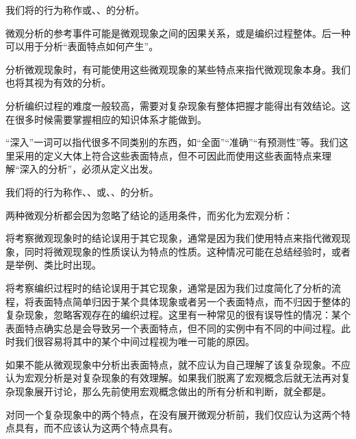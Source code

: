 我们将的行为称作或、、的分析。
\begin{explain}
微观分析的参考事件可能是微观现象之间的因果关系，或是编织过程整体。后一种可以用于分析“表面特点如何产生”。

分析微观现象时，有可能使用这些微观现象的某些特点来指代微观现象本身。我们也将其视为有效的分析。

分析编织过程的难度一般较高，需要对复杂现象有整体把握才能得出有效结论。这在很多时候需要掌握相应的知识体系才能做到。

“深入”一词可以指代很多不同类别的东西，如“全面”“准确”“有预测性”等。我们这里采用的定义大体上符合这些表面特点，但不可因此而使用这些表面特点来理解“深入的分析”，必须从定义出发。
\end{explain}
我们将的行为称作、、或、、的分析。
\begin{explain}
两种微观分析都会因为忽略了结论的适用条件，而劣化为宏观分析：

将考察微观现象时的结论误用于其它现象，通常是因为我们使用特点来指代微观现象，同时将微观现象的性质误认为特点的性质。这种情况可能在总结经验时，或者是举例、类比时出现。

将考察编织过程时的结论误用于其它现象，通常是因为我们过度简化了分析的流程，将表面特点简单归因于某个具体现象或者另一个表面特点，而不归因于整体的复杂现象，忽略客观存在的编织过程。这里有一种常见的很有误导性的情况：某个表面特点确实总是会导致另一个表面特点，但不同的实例中有不同的中间过程。此时我们很容易将其中的某个中间过程视为唯一可能的原因。

如果不能从微观现象中分析出表面特点，就不应认为自己理解了该复杂现象。不应认为宏观分析是对复杂现象的有效理解。如果我们脱离了宏观概念后就无法再对复杂现象展开讨论，那么先前使用宏观概念做出的所有分析和判断，就全都是。
\end{explain}
对同一个复杂现象中的两个特点，在没有展开微观分析前，我们仅应认为这两个特点具有，而不应该认为这两个特点具有。
